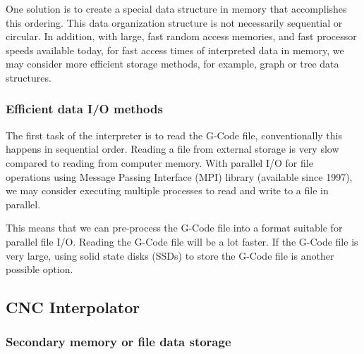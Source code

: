\begin{tcolorbox}[colback=green!15!white, colframe=red!75!black, title=Research consideration no. 7]
\justifying	
One solution is to create a special data structure in memory that accomplishes this ordering. This data organization structure is not necessarily sequential or circular. In addition, with large, fast random access memories, and fast processor speeds available today, for fast access times of interpreted data in memory, we may consider more efficient storage methods, for example, graph or tree data structures. 
\end{tcolorbox}


\subsubsection{Efficient data I/O methods}

The first task of the interpreter is to read the G-Code file, conventionally this happens in sequential order. Reading a file from external storage is very slow compared to reading from computer memory. With parallel I/O for file operations using  Message Passing Interface (MPI) library (available since 1997), we may consider executing multiple processes to read and write to a file in parallel. 

\begin{tcolorbox}[colback=green!15!white, colframe=red!75!black, title=Research consideration no. 7]
\justifying
This means that we can pre-process the G-Code file into a format suitable for parallel file I/O. Reading the G-Code file will be a lot faster. If the G-Code file is very large, using solid state disks (SSDs) to store the G-Code file is another possible option. 

\end{tcolorbox}

\subsection{CNC Interpolator}

\subsubsection{Secondary memory or file data storage}

